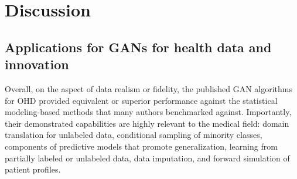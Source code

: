 \documentclass[10pt]{article}
\begin{document}
\section{Discussion}
\subsection{Applications for GANs for health data and innovation}

Overall, on the aspect of data realism or fidelity, the published GAN algorithms for OHD provided equivalent or superior performance against the statistical modeling-based methods that many authors benchmarked against. Importantly, their demonstrated capabilities are highly relevant to the medical field: domain translation for unlabeled data, conditional sampling of minority classes, components of predictive models that promote generalization, learning from partially labeled or unlabeled data, data imputation, and forward simulation of patient profiles.
\end{document}
